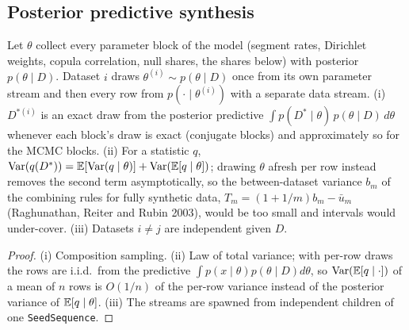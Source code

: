 \subsection{Posterior predictive synthesis}
\begin{proposition}\label{prop:postpred}
Let $\theta$ collect every parameter block of the model (segment rates, Dirichlet weights, copula correlation, null shares, the shares below) with posterior $p(\theta\mid D)$. Dataset $i$ draws $\theta^{(i)}\sim p(\theta\mid D)$ once from its own parameter stream and then every row from $p(\cdot\mid\theta^{(i)})$ with a separate data stream. (i) $D^{*(i)}$ is an exact draw from the posterior predictive $\int p(D^*\mid\theta)\,p(\theta\mid D)\,d\theta$ whenever each block's draw is exact (conjugate blocks) and approximately so for the MCMC blocks. (ii) For a statistic $q$, $\mathrm{Var}(q(D^*))=\mathbb{E}[\mathrm{Var}(q\mid\theta)]+\mathrm{Var}(\mathbb{E}[q\mid\theta])$; drawing $\theta$ afresh per row instead removes the second term asymptotically, so the between-dataset variance $b_m$ of the combining rules for fully synthetic data, $T_m=(1+1/m)b_m-\bar u_m$ (Raghunathan, Reiter and Rubin 2003), would be too small and intervals would under-cover. (iii) Datasets $i\ne j$ are independent given $D$.
\end{proposition}
\begin{proof}
(i) Composition sampling. (ii) Law of total variance; with per-row draws the rows are i.i.d.\ from the predictive $\int p(x\mid\theta)p(\theta\mid D)d\theta$, so $\mathrm{Var}(\mathbb{E}[q\mid\cdot])$ of a mean of $n$ rows is $O(1/n)$ of the per-row variance instead of the posterior variance of $\mathbb{E}[q\mid\theta]$. (iii) The streams are spawned from independent children of one \texttt{SeedSequence}.
\end{proof}
